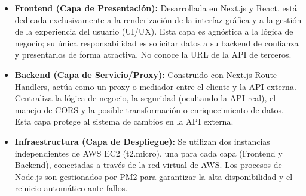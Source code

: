 \documentclass[11pt,a4paper]{article}
\begin{document}
\begin{itemize}[leftmargin=*]
    \item \textbf{Frontend (Capa de Presentación):} Desarrollada en Next.js y React, está dedicada exclusivamente a la renderización de la interfaz gráfica y a la gestión de la experiencia del usuario (UI/UX). Esta capa es agnóstica a la lógica de negocio; su única responsabilidad es solicitar datos a su backend de confianza y presentarlos de forma atractiva. No conoce la URL de la API de terceros.
    \item \textbf{Backend (Capa de Servicio/Proxy):} Construido con Next.js Route Handlers, actúa como un proxy o mediador entre el cliente y la API externa. Centraliza la lógica de negocio, la seguridad (ocultando la API real), el manejo de CORS y la posible transformación o enriquecimiento de datos. Esta capa protege al sistema de cambios en la API externa.
    \item \textbf{Infraestructura (Capa de Despliegue):} Se utilizan dos instancias independientes de AWS EC2 (t2.micro), una para cada capa (Frontend y Backend), conectadas a través de la red virtual de AWS. Los procesos de Node.js son gestionados por PM2 para garantizar la alta disponibilidad y el reinicio automático ante fallos.
\end{itemize}
\end{document}
